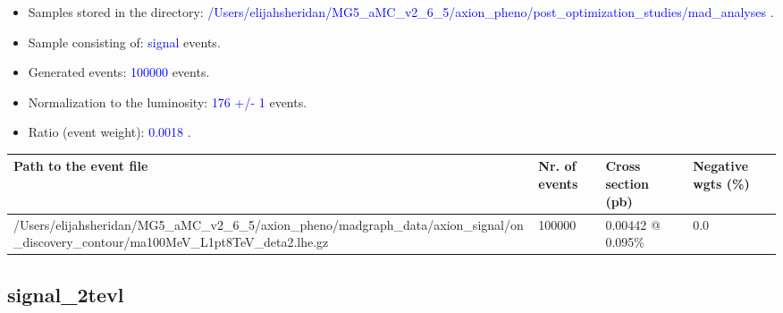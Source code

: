 \documentclass[a4paper, 10pt]{article}
\begin{document}
\begin{itemize}
  \item Samples stored in the directory: \textcolor{blue}{/\-Users/\-elijahsheridan/\-MG5\_aMC\_v2\_6\_5/\-axion\_pheno/\-post\_optimization\_studies/\-mad\_analyses} .
   \item Sample consisting of: \textcolor{blue}{signal}  events.
   \item Generated events: \textcolor{blue}{100000 }  events.
   \item Normalization to the luminosity: \textcolor{blue}{176}\textcolor{blue}{ +/\-- }\textcolor{blue}{1 }  events.
   \item Ratio (event weight): \textcolor{blue}{0.0018 } .  
 
\end{itemize}
\begin{table}[H]
  \begin{center}
    \begin{tabular}{|m{55.0mm}|m{25.0mm}|m{30.0mm}|m{30.0mm}|}
      \hline
      {\cellcolor{yellow}         Path to the event file}& {\cellcolor{yellow}         Nr. of events}& {\cellcolor{yellow}         Cross section (pb)}& {\cellcolor{yellow}         Negative wgts (\%)}\\
      \hline
      {\cellcolor{white}          /\-Users/\-elijahsheridan/\-MG5\_aMC\_v2\_6\_5/\-axion\_pheno/\-madgraph\_data/\-axion\_signal/\-on\_discovery\_contour/\-ma100MeV\_L1pt8TeV\_deta2.lhe.gz}& {\cellcolor{white}          100000}& {\cellcolor{white}          0.00442 @ 0.095\%}& {\cellcolor{white}          0.0}\\
\hline
    \end{tabular}
  \end{center}
\end{table}

\subsection{ signal\_2tevl}
\end{document}

